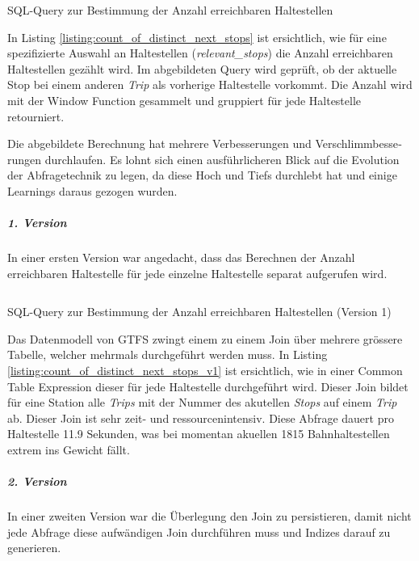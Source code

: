 \begin{listing}[ht]
    \inputminted{sql}{projectdoc/listing/count_of_distinct_next_stops.sql}
    \caption{SQL-Query zur Bestimmung der Anzahl erreichbaren Haltestellen}
    \label{listing:count_of_distinct_next_stops}
\end{listing}

In Listing \ref{listing:count_of_distinct_next_stops} ist ersichtlich, wie für eine spezifizierte Auswahl an Haltestellen (\emph{relevant\_stops}) die Anzahl erreichbaren Haltestellen gezählt wird.
Im abgebildeten Query wird geprüft, ob der aktuelle Stop bei einem anderen \emph{Trip} als vorherige Haltestelle vorkommt.
Die Anzahl wird mit der Window Function gesammelt und gruppiert für jede Haltestelle retourniert.

Die abgebildete Berechnung hat mehrere Verbesserungen und Ver­schlimm­bes­se­rungen durchlaufen.
Es lohnt sich einen ausführlicheren Blick auf die Evolution der Abfragetechnik zu legen, da diese Hoch und Tiefs durchlebt hat und einige Learnings daraus gezogen wurden.

\subparagraph{1. Version}
In einer ersten Version war angedacht, dass das Berechnen der Anzahl erreichbaren Haltestelle für jede einzelne Haltestelle separat aufgerufen wird.

\begin{listing}[ht]
    \inputminted{sql}{projectdoc/listing/count_of_distinct_next_stops_v1.sql}
    \caption{SQL-Query zur Bestimmung der Anzahl erreichbaren Haltestellen (Version 1)}
    \label{listing:count_of_distinct_next_stops_v1}
\end{listing}

Das Datenmodell von GTFS zwingt einem zu einem Join über mehrere grössere Tabelle, welcher mehrmals durchgeführt werden muss.
In Listing \ref{listing:count_of_distinct_next_stops_v1} ist ersichtlich, wie in einer Common Table Expression dieser für jede Haltestelle durchgeführt wird.
Dieser Join bildet für eine Station alle \emph{Trips} mit der Nummer des akutellen \emph{Stops} auf einem \emph{Trip} ab.
Dieser Join ist sehr zeit- und ressourcenintensiv.
Diese Abfrage dauert pro Haltestelle 11.9 Sekunden, was bei momentan akuellen 1815 Bahnhaltestellen extrem ins Gewicht fällt.

\subparagraph{2. Version}
In einer zweiten Version war die Überlegung den Join zu persistieren, damit nicht jede Abfrage diese aufwändigen Join durchführen muss und Indizes darauf zu generieren.

